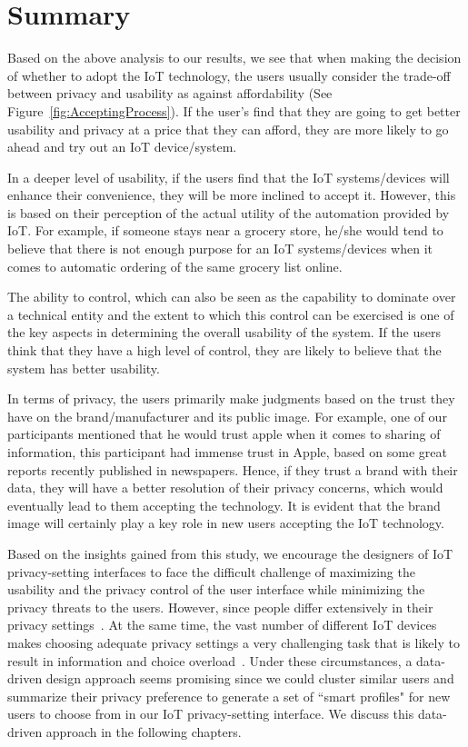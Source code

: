 \section{Summary}
Based on the above analysis to our results, we see that when making the decision of whether to adopt the IoT technology, the users usually consider the trade-off between privacy and usability as against affordability (See Figure~\ref{fig:AcceptingProcess}). If the user's find that they are going to get better usability and privacy at a price that they can afford, they are more likely to go ahead and try out an IoT device/system. 

In a deeper level of usability, if the users find that the IoT systems/devices will enhance their convenience, they will be more inclined to accept it. However, this is based on their perception of the actual utility of the automation provided by IoT. For example, if someone stays near a grocery store, he/she would tend to believe that there is not enough purpose for an IoT systems/devices when it comes to automatic ordering of the same grocery list online. 

The ability to control, which can also be seen as the capability to dominate over a technical entity and the extent to which this control can be exercised is one of the key aspects in determining the overall usability of the system. If the users think that they have a high level of control, they are likely to believe that the system has better usability.

In terms of privacy, the users primarily make judgments based on the trust they have on the brand/manufacturer and its public image. For example, one of our participants mentioned that he would trust apple when it comes to sharing of information, this participant had immense trust in Apple, based on some great reports recently published in newspapers. Hence, if they trust a brand with their data, they will have a better resolution of their privacy concerns, which would eventually lead to them accepting the technology. It is evident that the brand image will certainly play a key role in new users accepting the IoT technology.

Based on the insights gained from this study, we encourage the designers of IoT privacy-setting interfaces to face the difficult challenge of maximizing the usability and the privacy control of the user interface while minimizing the privacy threats to the users. However, since people differ extensively in their privacy settings~\cite{olson2005study}. At the same time, the vast number of different IoT devices makes choosing adequate privacy settings a very challenging task that is likely to result in information and choice overload~\cite{williams2016perfect}. Under these circumstances, a data-driven design approach seems promising since we could cluster similar users and summarize their privacy preference to generate a set of ``smart profiles" for new users to choose from in our IoT privacy-setting interface. We discuss this data-driven approach in the following chapters.
